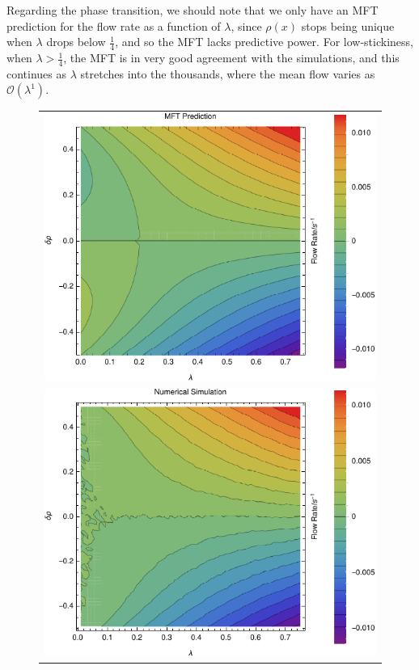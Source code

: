 \documentclass[
reprint, amsmath,amssymb,
]{revtex4-1}
\begin{document}
Regarding the phase transition, we should note that we only have an
MFT prediction for the flow rate as a function of $\lambda$, since
$\rho(x)$ stops being unique when $\lambda$ drops below $\frac{1}{4}$,
and so the MFT lacks predictive power. For low-stickiness, when
$\lambda>\frac{1}{4}$, the MFT is in very good agreement with the
simulations, and this continues as $\lambda$ stretches into the
thousands, where the mean flow varies as $\mathcal{O}(\lambda^1)$.



\begin{figure}[h!]
\vspace{0em}
\begin{center}
 \begin{tabular}{c}
    \includegraphics[width=1\linewidth]{newMftPred} \\
    \includegraphics[width=1\linewidth]{newFlow}

\end{tabular}
\end{center}
\end{figure}
\end{document}
